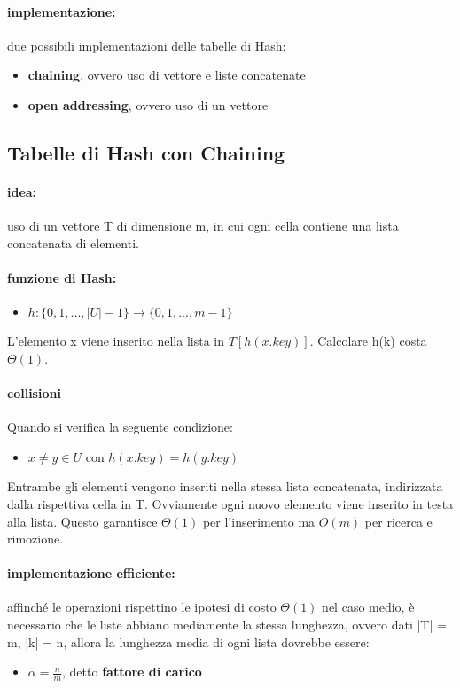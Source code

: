 \documentclass{article}
\begin{document}
\paragraph{implementazione:} due possibili implementazioni delle tabelle di Hash:
\begin{itemize}
    \item \textbf{chaining}, ovvero uso di vettore e liste concatenate
    \item \textbf{open addressing}, ovvero uso di un vettore
\end{itemize}

\subsection{Tabelle di Hash con Chaining} %
\paragraph{idea:} uso di un vettore T di dimensione m, in cui ogni cella contiene una lista concatenata di elementi.
\paragraph{funzione di Hash:}
\begin{itemize}
    \item  $h: \{ 0,1,...,|U|-1 \} \rightarrow \{0,1,...,m-1\}$
\end{itemize}
L'elemento x viene inserito nella lista in $T[h(x.key)]$. Calcolare h(k) costa $\Theta(1)$.
\paragraph{collisioni} Quando si verifica la seguente condizione:
\begin{itemize}
    \item $x \neq y \in U$ con $h(x.key) = h(y.key)$
\end{itemize}
Entrambe gli elementi vengono inseriti nella stessa lista concatenata, indirizzata dalla rispettiva cella in T. Ovviamente ogni 
nuovo elemento viene inserito in testa alla lista. Questo garantisce $\Theta(1)$ per l'inserimento ma $O(m)$ per ricerca e rimozione.

\paragraph{implementazione efficiente:} affinché le operazioni rispettino le ipotesi di costo $\Theta(1)$ nel caso medio, è necessario che le liste abbiano 
mediamente la stessa lunghezza, ovvero dati |T| = m, |k| = n, allora la lunghezza media di ogni lista dovrebbe essere:
\begin{itemize}
\item $\displaystyle \alpha = \frac{n}{m}$, detto \textbf{fattore di carico}
\end{itemize}
\end{document}
